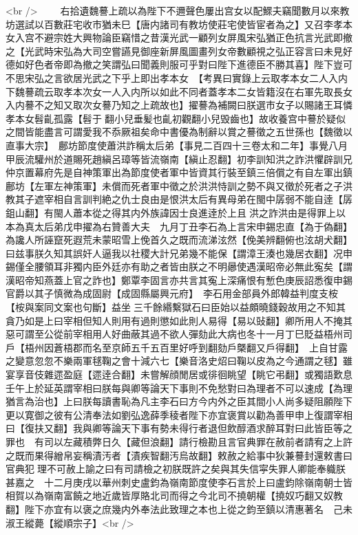 <br />
　　右拾遺魏謩上疏以為陛下不邇聲色屢出宫女以配鰥夫竊聞數月以來教坊選試以百數莊宅收市猶未巳【唐内諸司有教坊使莊宅使皆宦者為之】又召李孝本女入宫不避宗姓大興物論臣竊惜之昔漢光武一顧列女屏風宋弘猶正色抗言光武即撤之【光武時宋弘為大司空嘗讌見御座新屏風圖畫列女帝數顧視之弘正容言曰未見好德如好色者帝即為撤之笑謂弘曰聞義則服可乎對曰陛下進德臣不勝其喜】陛下豈可不思宋弘之言欲居光武之下乎上即出孝本女　【考異曰實錄上云取孝本女二人入内下魏謩疏云取孝本次女一人入内所以如此不同者蓋孝本二女皆籍沒在右軍先取長女入内謩不之知又取次女謩乃知之上疏故也】擢謩為補闕曰朕選市女子以賜諸王耳憐孝本女髫齓孤露【髫于翻小兒垂髪也齓初觀翻小兒毁齒也】故收養宫中謩於疑似之間皆能盡言可謂愛我不忝厥祖矣命中書優為制辭以賞之謩徵之五世孫也【魏徵以直事大宗】　鄜坊節度使蕭洪詐稱太后弟【事見二百四十三卷太和二年】事覺八月甲辰流驩州於道賜死趙縝呂璋等皆流嶺南【縝止忍翻】初李訓知洪之詐洪懼辟訓兄仲京置幕府先是自神策軍出為節度使者軍中皆資其行裝至鎮三倍償之有自左軍出鎮鄜坊【左軍左神策軍】未償而死者軍中徵之於洪洪恃訓之勢不與又徵於死者之子洪教其子遮宰相自言訓判絶之仇士良由是恨洪太后有異母弟在閩中孱弱不能自逹【孱鉏山翻】有閩人蕭本從之得其内外族諱因士良進逹於上且洪之詐洪由是得罪上以本為真太后弟戊申擢為右贊善大夫　九月丁丑李石為上言宋申錫忠直【為于偽翻】為讒人所誣竄死遐荒未蒙昭雪上俛首久之既而流涕泫然【俛美辨翻俯也泫胡犬翻】曰兹事朕久知其誤奸人逼我以社稷大計兄弟幾不能保【謂漳王湊也幾居衣翻】况申錫僅全腰領耳非獨内臣外廷亦有助之者皆由朕之不明曏使遇漢昭帝必無此寃矣【謂漢昭帝知燕蓋上官之詐也】鄭覃李固言亦共言其寃上深痛恨有慙色庚辰詔悉復申錫官爵以其子慎微為成固尉【成固縣屬興元府】　李石用金部員外郎韓益判度支桉【桉與案同文案也句斷】益坐三千餘緡繫獄石曰臣始以益頗曉錢穀故用之不知其貪乃如是上曰宰相但知人則用有過則懲如此則人易得【易以䜴翻】卿所用人不掩其惡可謂至公從前宰相用人好曲蔽其過不欲人彈劾此大病也冬十一月丁巳貶益梧州司戶【梧州因蒼梧郡而名至京師五千五百里好呼到翻劾戶槩翻又戶得翻】　上自甘露之變意忽忽不樂兩軍毬鞠之會十減六七【樂音洛史炤曰鞠以皮為之今通謂之毬】雖宴享音伎雜遝盈庭【遝逹合翻】未嘗解顔閒居或徘徊眺望【眺它弔翻】或獨語歎息壬午上於延英謂宰相曰朕每與卿等論天下事則不免愁對曰為理者不可以速成【為理猶言為治也】上曰朕每讀書恥為凡主李石曰方今内外之臣其間小人尚多疑阻願陛下更以寛御之彼有公清奉法如劉弘逸薛季稜者陛下亦宜褒賞以勸為善甲申上復謂宰相曰【復扶又翻】我與卿等論天下事有勢未得行者退但飲醇酒求醉耳對曰此皆臣等之罪也　有司以左藏積弊日久【藏但浪翻】請行檢勘且言官典罪在赦前者請宥之上許之既而果得繒帛妄稱漬汚者【漬疾智翻汚烏故翻】敕赦之給事中狄兼謩封還敕書曰官典犯理不可赦上諭之曰有司請檢之初朕既許之矣與其失信寜失罪人卿能奉軄朕甚嘉之　十二月庚戌以華州刺史盧鈞為嶺南節度使李石言於上曰盧鈞除嶺南朝士皆相賀以為嶺南富饒之地近歲皆厚賂北司而得之今北司不撓朝權【撓奴巧翻又奴教翻】陛下亦宜有以褒之庶幾内外奉法此致理之本也上從之鈞至鎮以清惠著名　己未淑王縱薨【縱順宗子】<br />
